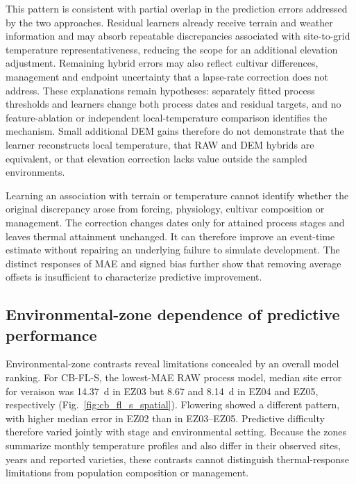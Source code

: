 \documentclass[a4paper,12pt]{article}
\let\OriginalSubsection\subsection
\renewcommand{\subsection}{\FloatBarrier\OriginalSubsection}
\begin{document}
This pattern is consistent with partial overlap in the prediction errors addressed by the two approaches. Residual learners already receive terrain and weather information and may absorb repeatable discrepancies associated with site-to-grid temperature representativeness, reducing the scope for an additional elevation adjustment. Remaining hybrid errors may also reflect cultivar differences, management and endpoint uncertainty that a lapse-rate correction does not address. These explanations remain hypotheses: separately fitted process thresholds and learners change both process dates and residual targets, and no feature-ablation or independent local-temperature comparison identifies the mechanism. Small additional DEM gains therefore do not demonstrate that the learner reconstructs local temperature, that RAW and DEM hybrids are equivalent, or that elevation correction lacks value outside the sampled environments.

Learning an association with terrain or temperature cannot identify whether the original discrepancy arose from forcing, physiology, cultivar composition or management. The correction changes dates only for attained process stages and leaves thermal attainment unchanged. It can therefore improve an event-time estimate without repairing an underlying failure to simulate development. The distinct responses of MAE and signed bias further show that removing average offsets is insufficient to characterize predictive improvement.

\subsection{Environmental-zone dependence of predictive performance}

Environmental-zone contrasts reveal limitations concealed by an overall model ranking. For CB-FL-S, the lowest-MAE RAW process model, median site error for veraison was 14.37~d in EZ03 but 8.67 and 8.14~d in EZ04 and EZ05, respectively (Fig.~\ref{fig:cb_fl_s_spatial}). Flowering showed a different pattern, with higher median error in EZ02 than in EZ03--EZ05. Predictive difficulty therefore varied jointly with stage and environmental setting. Because the zones summarize monthly temperature profiles and also differ in their observed sites, years and reported varieties, these contrasts cannot distinguish thermal-response limitations from population composition or management.
\end{document}
